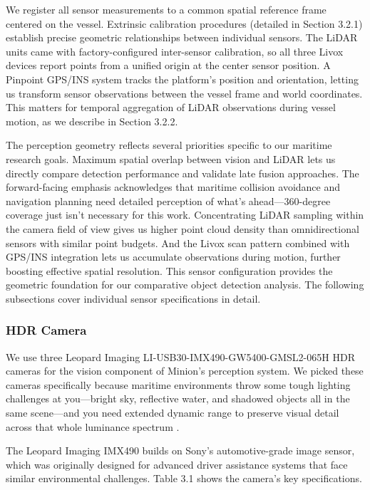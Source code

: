 \documentclass{erauthesis}
\begin{document}
We register all sensor measurements to a common spatial reference frame centered on the vessel.
Extrinsic calibration procedures (detailed in Section 3.2.1) establish precise geometric relationships between individual sensors.
The \ac{LiDAR} units came with factory-configured inter-sensor calibration, so all three Livox devices report points from a unified origin at the center sensor position.
A Pinpoint \ac{GPS}/\ac{INS} system tracks the platform's position and orientation, letting us transform sensor observations between the vessel frame and world coordinates.
This matters for temporal aggregation of \ac{LiDAR} observations during vessel motion, as we describe in Section 3.2.2.

The perception geometry reflects several priorities specific to our maritime research goals.
Maximum spatial overlap between vision and \ac{LiDAR} lets us directly compare detection performance and validate late fusion approaches.
The forward-facing emphasis acknowledges that maritime collision avoidance and navigation planning need detailed perception of what's ahead—360-degree coverage just isn't necessary for this work.
Concentrating \ac{LiDAR} sampling within the camera field of view gives us higher point cloud density than omnidirectional sensors with similar point budgets.
And the Livox scan pattern combined with \ac{GPS}/\ac{INS} integration lets us accumulate observations during motion, further boosting effective spatial resolution.
This sensor configuration provides the geometric foundation for our comparative object detection analysis.
The following subsections cover individual sensor specifications in detail.

            \subsubsection{HDR Camera}

We use three Leopard Imaging LI-USB30-IMX490-GW5400-GMSL2-065H \ac{HDR} cameras for the vision component of Minion's perception system.
We picked these cameras specifically because maritime environments throw some tough lighting challenges at you—bright sky, reflective water, and shadowed objects all in the same scene—and you need extended dynamic range to preserve visual detail across that whole luminance spectrum \cite{thompson2023}.

The Leopard Imaging IMX490 builds on Sony's automotive-grade image sensor, which was originally designed for advanced driver assistance systems that face similar environmental challenges.
Table 3.1 shows the camera's key specifications.
\end{document}
